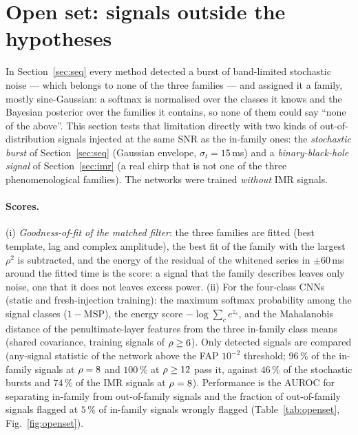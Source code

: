 \section{Open set: signals outside the hypotheses}\label{sec:openset}

In Section~\ref{sec:seq} every method detected a burst of band-limited stochastic noise --- which belongs to none of the three families --- and assigned it a family, mostly sine-Gaussian: a softmax is normalised over the classes it knows and the Bayesian posterior over the families it contains, so none of them could say ``none of the above''. This section tests that limitation directly with two kinds of out-of-distribution signals injected at the same SNR as the in-family ones: the \emph{stochastic burst} of Section~\ref{sec:seq} (Gaussian envelope, $\sigma_t=15$\,ms) and a \emph{binary-black-hole signal} of Section~\ref{sec:imr} (a real chirp that is not one of the three phenomenological families). The networks were trained \emph{without} IMR signals.

\paragraph{Scores.} (i) \emph{Goodness-of-fit of the matched filter}: the three families are fitted (best template, lag and complex amplitude), the best fit of the family with the largest $\rho^2$ is subtracted, and the energy of the residual of the whitened series in $\pm60$\,ms around the fitted time is the score: a signal that the family describes leaves only noise, one that it does not leaves excess power. (ii) For the four-class CNNs (static and fresh-injection training): the maximum softmax probability among the signal classes ($1-\mathrm{MSP}$), the energy score $-\log\sum_ce^{z_c}$, and the Mahalanobis distance of the penultimate-layer features from the three in-family class means (shared covariance, training signals of $\rho\ge6$).
Only detected signals are compared (any-signal statistic of the network above the FAP $10^{-2}$ threshold; $96\,\%$ of the in-family signals at $\rho=8$ and $100\,\%$ at $\rho\ge12$ pass it, against $46\,\%$ of the stochastic bursts and $74\,\%$ of the IMR signals at $\rho=8$). Performance is the AUROC for separating in-family from out-of-family signals and the fraction of out-of-family signals flagged at $5\,\%$ of in-family signals wrongly flagged (Table~\ref{tab:openset}, Fig.~\ref{fig:openset}).

